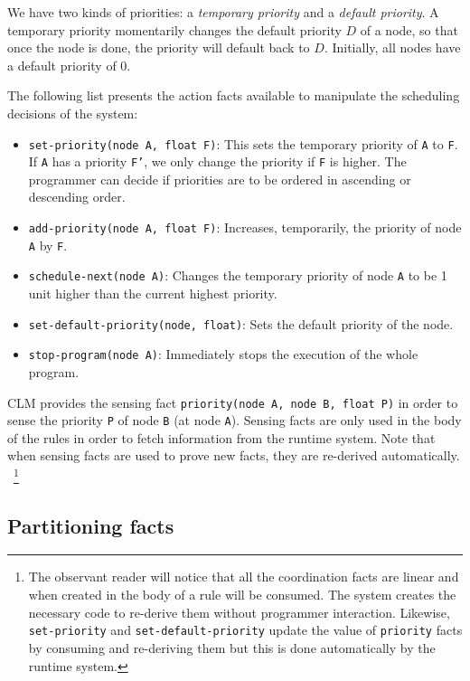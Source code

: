 We have two kinds of priorities: a \emph{temporary priority} and a \emph{default
priority}. A temporary priority momentarily changes the default priority $D$ of a
node, so that once the node is done, the priority will default back to $D$.
Initially, all nodes have a default priority of $0$.

The following list presents the action facts available to manipulate the scheduling
decisions of the system:

\newcommand{\code}[1]{\texttt{\small{#1}}}

\begin{itemize}
   \item \code{set-priority(node A, float F)}: This sets the
   temporary priority of \texttt{A} to \texttt{F}. If \texttt{A} has a priority
   \texttt{F'}, we only change the priority if \texttt{F} is higher. The programmer
   can decide if priorities are to be ordered in ascending or descending order.
   \item \code{add-priority(node A, float F)}: Increases,
   temporarily, the priority of node \texttt{A} by \texttt{F}.
   \item \code{schedule-next(node A)}: Changes the temporary priority of node
   \texttt{A} to be 1 unit higher than the current highest priority.
   \item \code{set-default-priority(node, float)}: Sets the default
   priority of the node.
   \item \code{stop-program(node A)}: Immediately stops the
   execution of the whole program.
\end{itemize}

CLM provides the sensing fact \code{priority(node A, node B, float P)} in order to sense the
priority \texttt{P} of node \texttt{B} (at node \texttt{A}).
Sensing facts are only used in the body of the rules in order
to fetch information from the runtime system.
Note that when sensing facts are used to prove new facts, they are re-derived automatically.
~\footnote{The observant reader will notice that all the coordination facts are
linear and when created in the body of a rule will be consumed. The system
creates the necessary code to re-derive them without programmer interaction.
Likewise, \texttt{set-priority} and \texttt{set-default-priority} update the
value of \texttt{priority} facts by consuming and re-deriving them but this is
done automatically by the runtime system.}

\subsection{Partitioning facts}

